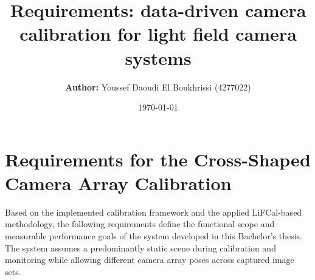 \documentclass[12pt]{scrartcl}
\title{\vspace{5cm}\textbf{Requirements:} data-driven camera calibration for light field camera systems}
\author{\textbf{Author: } Youssef Daoudi El Boukhrissi (4277022)}
\date{\today}
\begin{document}
\maketitle

\newpage
{}

\section*{Requirements for the Cross-Shaped Camera Array Calibration}

Based on the implemented calibration framework and the applied LiFCal-based methodology,
the following requirements define the functional scope and measurable performance goals
of the system developed in this Bachelor's thesis.
The system assumes a predominantly static scene during calibration and monitoring
while allowing different camera array poses across captured image sets.
\end{document}
